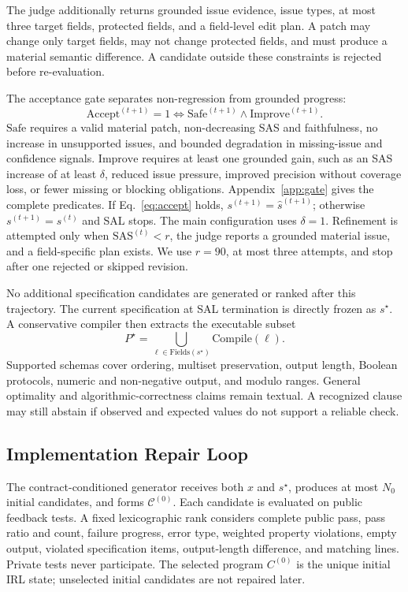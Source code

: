 The judge additionally returns grounded issue evidence, issue types, at most three target fields, protected fields, and a field-level edit plan. A patch may change only target fields, may not change protected fields, and must produce a material semantic difference. A candidate outside these constraints is rejected before re-evaluation.

The acceptance gate separates non-regression from grounded progress:
\begin{equation}
\mathrm{Accept}^{(t+1)}=1\iff
\mathrm{Safe}^{(t+1)}\land\mathrm{Improve}^{(t+1)}.
\label{eq:accept}
\end{equation}
$\mathrm{Safe}$ requires a valid material patch, non-decreasing SAS and faithfulness, no increase in unsupported issues, and bounded degradation in missing-issue and confidence signals. $\mathrm{Improve}$ requires at least one grounded gain, such as an SAS increase of at least $\delta$, reduced issue pressure, improved precision without coverage loss, or fewer missing or blocking obligations. Appendix~\ref{app:gate} gives the complete predicates. If Eq.~\eqref{eq:accept} holds, $s^{(t+1)}=\hat{s}^{(t+1)}$; otherwise $s^{(t+1)}=s^{(t)}$ and SAL stops. The main configuration uses $\delta=1$. Refinement is attempted only when $\mathrm{SAS}^{(t)}<r$, the judge reports a grounded material issue, and a field-specific plan exists. We use $r=90$, at most three attempts, and stop after one rejected or skipped revision.

No additional specification candidates are generated or ranked after this trajectory. The current specification at SAL termination is directly frozen as $s^\star$. A conservative compiler then extracts the executable subset
\begin{equation}
P^\star=\bigcup_{\ell\in\mathrm{Fields}(s^\star)}\mathrm{Compile}(\ell).
\label{eq:compile}
\end{equation}
Supported schemas cover ordering, multiset preservation, output length, Boolean protocols, numeric and non-negative output, and modulo ranges. General optimality and algorithmic-correctness claims remain textual. A recognized clause may still abstain if observed and expected values do not support a reliable check.

\subsection{Implementation Repair Loop}

The contract-conditioned generator receives both $x$ and $s^\star$, produces at most $N_0$ initial candidates, and forms $\mathcal C^{(0)}$. Each candidate is evaluated on public feedback tests. A fixed lexicographic rank considers complete public pass, pass ratio and count, failure progress, error type, weighted property violations, empty output, violated specification items, output-length difference, and matching lines. Private tests never participate. The selected program $C^{(0)}$ is the unique initial IRL state; unselected initial candidates are not repaired later.

